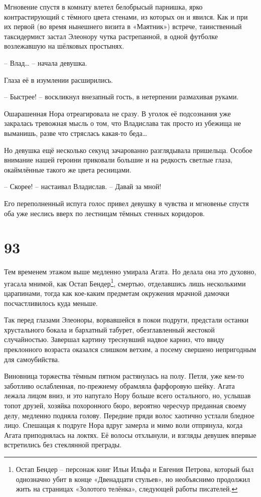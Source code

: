 \documentclass[
  a5paperpaper,
  DIV=11,
  numbers=noendperiod]{scrreprt}
\begin{document}
Мгновение спустя в комнату влетел белобрысый парнишка, ярко
контрастирующий с тёмного цвета стенами, из которых он и явился. Как и
при их первой (во время нынешнего визита в «Маятник») встрече,
таинственный таксидермист застал Элеонору чутка растрепанной, в одной
футболке возлежавшую на шёлковых простынях.

-- Влад\ldots{} -- начала девушка.

Глаза её в изумлении расширились.

-- Быстрее! -- воскликнул внезапный гость, в нетерпении размахивая
руками.

Ошарашенная Нора отреагировала не сразу. В уголок её подсознания уже
закралась тревожная мысль о том, что Владислава так просто из убежища не
выманишь, разве что стряслась какая-то беда\ldots{}

Но девушка ещё несколько секунд зачарованно разглядывала пришельца.
Особое внимание нашей героини приковали большие и на редкость светлые
глаза, окаймлённые такого же цвета ресницами.

-- Скорее! -- настаивал Владислав. -- Давай за мной!

Его переполненный испуга голос привел девушку в чувства и мгновенье
спустя оба уже неслись вверх по лестницам тёмных стенных коридоров.

\section*{93}\label{93}


Тем временем этажом выше медленно умирала Агата. Но делала она это
духовно, угасала мнимой, как Остап Бендер\footnote{Остап Бендер --
  персонаж книг Ильи Ильфа и Евгения Петрова, который был однозначно
  убит в конце «Двенадцати стульев», но необъяснимо продолжил жить на
  страницах «Золотого телёнка», следующей работы писателей.}, смертью,
отделавшись лишь несколькими царапинами, тогда как кое-каким предметам
окружения мрачной дамочки посчастливилось куда меньше.

Так перед глазами Элеоноры, ворвавшейся в покои подруги, предстали
останки хрустального бокала и бархатный табурет, обезглавленный жестокой
случайностью. Завершал картину треснувший надвое карниз, что ввиду
преклонного возраста оказался слишком ветхим, а посему свершено
непригодным для самоубийства.

Виновница торжества тёмным пятном растянулась на полу. Петля, уже кем-то
заботливо ослабленная, по-прежнему обрамляла фарфоровую шейку. Агата
лежала лицом вниз, и это напугало Нору больше всего остального, но,
услышав топот друзей, хозяйка похоронного бюро, вероятно чересчур
преданная своему делу, медленно подняла голову. Передние пряди волос
хаотично устлали бледное лицо. Спешащая к подруге Нора вдруг замерла и
мимо воли отпрянула, когда Агата приподнялась на локтях. Её волосы
отхлынули, и взгляды девушек впервые встретились без стеклянной
преграды.
\end{document}
